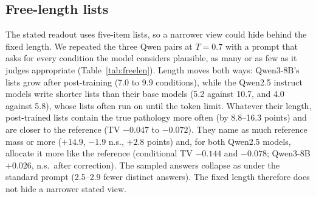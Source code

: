 \documentclass[wcp]{jmlr}
\begin{document}
\subsection{Free-length lists}\label{sec:freelen}
The stated readout uses five-item lists, so a narrower view could hide behind the fixed length. We repeated the three Qwen pairs at $T{=}0.7$ with a prompt that asks for every condition the model considers plausible, as many or as few as it judges appropriate (Table~\ref{tab:freelen}). Length moves both ways: Qwen3-8B's lists grow after post-training (7.0 to 9.9 conditions), while the Qwen2.5 instruct models write shorter lists than their base models (5.2 against 10.7, and 4.0 against 5.8), whose lists often run on until the token limit. Whatever their length, post-trained lists contain the true pathology more often (by 8.8--16.3 points) and are closer to the reference (TV $-0.047$ to $-0.072$). They name as much reference mass or more ($+14.9$, $-1.9$ n.s., $+2.8$ points) and, for both Qwen2.5 models, allocate it more like the reference (conditional TV $-0.144$ and $-0.078$; Qwen3-8B $+0.026$, n.s.\ after correction). The sampled answers collapse as under the standard prompt (2.5--2.9 fewer distinct answers). The fixed length therefore does not hide a narrower stated view.
\end{document}
